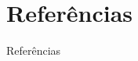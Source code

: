\documentclass[aspectratio=169]{beamer}
\begin{document}
\section*{Referências}
\begin{frame}[allowframebreaks]{Referências}
  \footnotesize
  \nocite{cormen2012algoritmos,knuth2011taocp4a,kreher1999combinatorial,skiena2020algorithm,sedgewick1977permutation,ziviani2011projeto}
  
  
\end{frame}
\end{document}
